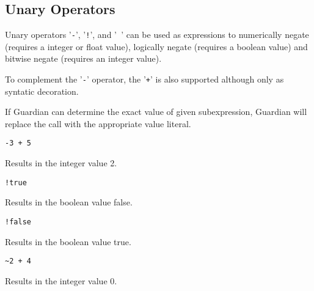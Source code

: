 
\subsection{Unary Operators}
{
	Unary operators '\texttt{-}', '\texttt{!}',
	and '\texttt{~}' can be used as expressions to
	numerically negate (requires a integer or float value),
	logically negate (requires a boolean value) and
	bitwise negate (requires an integer value).
	
	To complement the '\texttt{-}' operator, the '\texttt{+}' is also supported
	although only as syntatic decoration.
	
	If Guardian can determine the exact value of given subexpression,
	Guardian will replace the call with the appropriate value literal.
	
	\begin{itemize}
	{
		\item[] \texttt{-3 + 5}
		
			Results in the integer value 2.
		
		\item[] \texttt{!true}
		
			Results in the boolean value false.
		
		\item[] \texttt{!false}
		
			Results in the boolean value true.
		
		\item[] \texttt{\~{}2 + 4}
		
			Results in the integer value 0.
	}
	\end{itemize}
}
